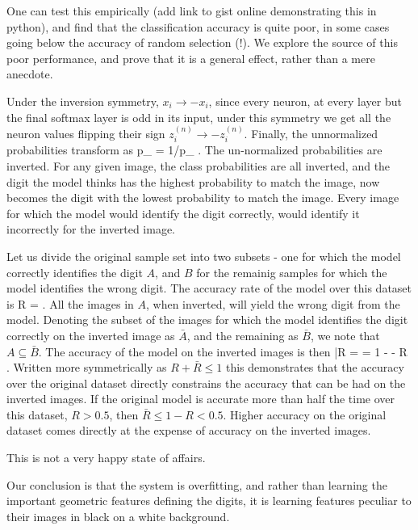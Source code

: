 \documentclass[twocolumn, prl]{revtex4-1}
\begin{document}
One can test this empirically (add link to gist online demonstrating this in python), and find that the classification accuracy is quite poor, in some cases going below the accuracy of random selection (!). We explore the source of this poor performance, and prove that it is a general effect, rather than a mere anecdote.

Under the inversion symmetry, $x_i \rightarrow - x_i$, since every neuron, at every layer but the final softmax layer is odd in its 
input, under this symmetry we get all the neuron values flipping their sign $z^{(n)}_i \rightarrow - z^{(n)}_i$. Finally, the unnormalized probabilities transform as
\be
{\tilde p}_{\alpha} \rightarrow \exp{} = 1/{\tilde p}_{\alpha}
\; .
\ee
The un-normalized probabilities are inverted. For any given image, the class probabilities are all inverted, and the digit the model thinks has the highest probability to match the image, now becomes the digit with the lowest probability to match the image. Every image for which the model would identify the digit correctly, would identify it incorrectly for the inverted image.

Let us divide the original sample set into two subsets - one for which the model correctly identifies the digit $A$, and $B$ for the remainig samples for which the model identifies the wrong digit. The accuracy rate of the model over this dataset is 
\be
R = 
\; .
\ee
All the images in $A$, when inverted, will yield the wrong digit from the model. Denoting the subset of the images for which the model identifies the digit correctly on the inverted image as ${\bar A}$, and the remaining as ${\bar B}$, we note that $A \subseteq {\bar B}$. The accuracy of the model on the inverted images is then
\be
{\bar R} =  = 1 -   - R
\; .
\ee
Written more symmetrically as $R + {\bar R} \leq 1$ this demonstrates that the accuracy over the original dataset directly constrains the accuracy that can be had on the inverted images. If the original model is accurate more than half the time over this dataset, $R>0.5$, then ${\bar R} \leq 1 - R < 0.5$. Higher accuracy on the original dataset comes directly at the expense of accuracy on the inverted images. 

This is not a very happy state of affairs. 

Our conclusion is that the system is overfitting, and rather than learning the important geometric features defining the digits, it is learning features peculiar to their images in black on a white background.
\end{document}
